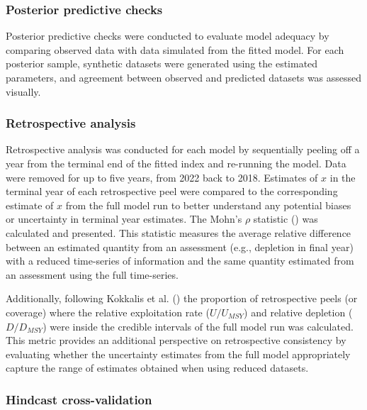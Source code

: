 \documentclass[
  11pt,
]{SCreport}
\begin{document}
\subsubsection{Posterior predictive
checks}\label{sec-posterior-predictive-checks}

Posterior predictive checks were conducted to evaluate model adequacy by
comparing observed data with data simulated from the fitted model. For
each posterior sample, synthetic datasets were generated using the
estimated parameters, and agreement between observed and predicted
datasets was assessed visually.

\subsubsection{Retrospective analysis}\label{sec-retrospective-analysis}

Retrospective analysis was conducted for each model by sequentially
peeling off a year from the terminal end of the fitted index and
re-running the model. Data were removed for up to five years, from 2022
back to 2018. Estimates of \(x\) in the terminal year of each
retrospective peel were compared to the corresponding estimate of \(x\)
from the full model run to better understand any potential biases or
uncertainty in terminal year estimates. The Mohn's \(\rho\) statistic
() was calculated and
presented. This statistic measures the average relative difference
between an estimated quantity from an assessment (e.g., depletion in
final year) with a reduced time-series of information and the same
quantity estimated from an assessment using the full time-series.

Additionally, following Kokkalis et al.
() the proportion of
retrospective peels (or coverage) where the relative exploitation rate
(\(U/U_{MSY}\)) and relative depletion (\(D/D_{MSY}\)) were inside the
credible intervals of the full model run was calculated. This metric
provides an additional perspective on retrospective consistency by
evaluating whether the uncertainty estimates from the full model
appropriately capture the range of estimates obtained when using reduced
datasets.

\subsubsection{Hindcast
cross-validation}\label{sec-hindcast-cross-validation}
\end{document}
